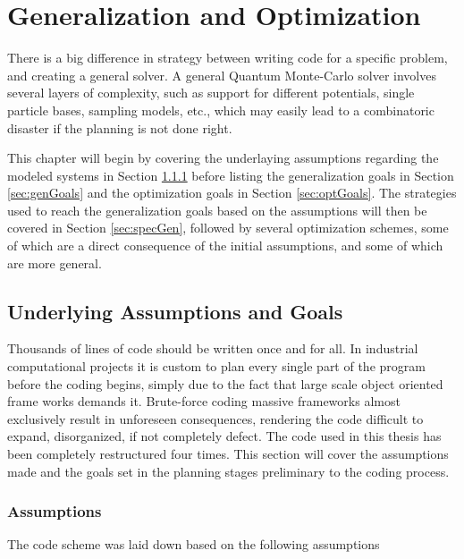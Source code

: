 \chapter{Generalization and Optimization}
\label{ch:optAndGen}

There is a big difference in strategy between writing code for a specific problem, and creating a general solver. A general Quantum Monte-Carlo solver involves several layers of complexity, such as support for different potentials, single particle bases, sampling models, etc., which may easily lead to a combinatoric disaster if the planning is not done right. 

This chapter will begin by covering the underlaying assumptions regarding the modeled systems in Section \ref{sec:ass} before listing the generalization goals in Section \ref{sec:genGoals} and the optimization goals in Section \ref{sec:optGoals}. The strategies used to reach the generalization goals based on the assumptions will then be covered in Section \ref{sec:specGen}, followed by several optimization schemes, some of which are a direct consequence of the initial assumptions, and some of which are more general.

\section{Underlying Assumptions and Goals}
\label{sec:AssGoal}

Thousands of lines of code should be written once and for all. In industrial computational projects it is custom to plan every single part of the program before the coding begins, simply due to the fact that large scale object oriented frame works demands it. Brute-force coding massive frameworks almost exclusively result in unforeseen consequences, rendering the code difficult to expand, disorganized, if not completely defect. The code used in this thesis has been completely restructured four times. This section will cover the assumptions made and the goals set in the planning stages preliminary to the coding process.

\subsection{Assumptions}
\label{sec:ass}

The code scheme was laid down based on the following assumptions


